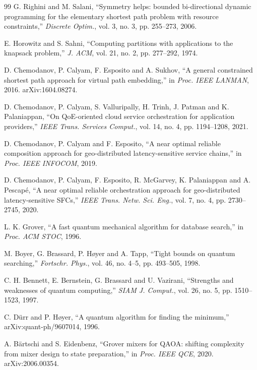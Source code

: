 \documentclass[journal]{IEEEtran}
\begin{document}
\begin{thebibliography}{99}
G. Righini and M. Salani, ``Symmetry helps: bounded bi-directional dynamic programming for the elementary shortest path problem with resource constraints,'' \emph{Discrete Optim.}, vol. 3, no. 3, pp. 255--273, 2006.

E. Horowitz and S. Sahni, ``Computing partitions with applications to the knapsack problem,'' \emph{J. ACM}, vol. 21, no. 2, pp. 277--292, 1974.

D. Chemodanov, P. Calyam, F. Esposito and A. Sukhov, ``A general constrained shortest path approach for virtual path embedding,'' in \emph{Proc. IEEE LANMAN}, 2016. arXiv:1604.08274.

D. Chemodanov, P. Calyam, S. Valluripally, H. Trinh, J. Patman and K. Palaniappan, ``On QoE-oriented cloud service orchestration for application providers,'' \emph{IEEE Trans. Services Comput.}, vol. 14, no. 4, pp. 1194--1208, 2021.

D. Chemodanov, P. Calyam and F. Esposito, ``A near optimal reliable composition approach for geo-distributed latency-sensitive service chains,'' in \emph{Proc. IEEE INFOCOM}, 2019.

D. Chemodanov, P. Calyam, F. Esposito, R. McGarvey, K. Palaniappan and A. Pescapé, ``A near optimal reliable orchestration approach for geo-distributed latency-sensitive SFCs,'' \emph{IEEE Trans. Netw. Sci. Eng.}, vol. 7, no. 4, pp. 2730--2745, 2020.

L. K. Grover, ``A fast quantum mechanical algorithm for database search,'' in \emph{Proc. ACM STOC}, 1996.

M. Boyer, G. Brassard, P. Høyer and A. Tapp, ``Tight bounds on quantum searching,'' \emph{Fortschr. Phys.}, vol. 46, no. 4--5, pp. 493--505, 1998.

C. H. Bennett, E. Bernstein, G. Brassard and U. Vazirani, ``Strengths and weaknesses of quantum computing,'' \emph{SIAM J. Comput.}, vol. 26, no. 5, pp. 1510--1523, 1997.

C. Dürr and P. Høyer, ``A quantum algorithm for finding the minimum,'' arXiv:quant-ph/9607014, 1996.

A. Bärtschi and S. Eidenbenz, ``Grover mixers for QAOA: shifting complexity from mixer design to state preparation,'' in \emph{Proc. IEEE QCE}, 2020. arXiv:2006.00354.


\end{thebibliography}
\end{document}
